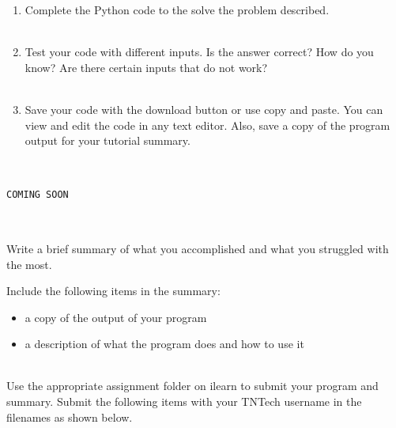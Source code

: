 \documentclass[12pt]{article}
\begin{document}
\begin{description}[labelindent=1cm]
\begin{enumerate}
		\item Complete the Python code to the solve the problem described. \\\\
		
		\item Test your code with different inputs. Is the answer correct? How do you know? Are there certain inputs that do not work? \\\\
		
		\item Save your code with the download button or use copy and paste. You can view and edit the code in any text editor. Also, save a copy of the program output for your tutorial summary. \\\\

	\end{enumerate}

\newpage
\item[\textbf{\underline{Solution Code:}}] \hfill \vspace{0mm}

\begin{lstlisting}

COMING SOON
	
\end{lstlisting}

\item[\textbf{\underline{Tutorial Summary:}}] \hfill \vspace{3mm}\\ 
Write a brief summary of what you accomplished and what you struggled with the most. 

Include the following items in the summary:
\begin{itemize}

\item a copy of the output of your program
\item a description of what the program does and how to use it

\end{itemize}


\item[\textbf{\underline{Submission:}}] \hfill \vspace{3mm}\\ 
Use the appropriate assignment folder on ilearn to submit your program and summary. Submit the following items with your TNTech username in the filenames as shown below. \vspace{0mm}\\


\end{description}
\end{document}
